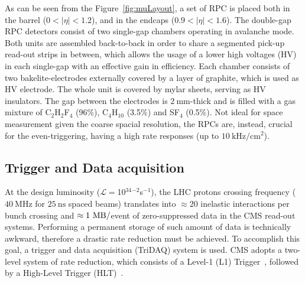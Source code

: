 As can be seen from the Figure~\ref{fig:muLayout}, a set of RPC is placed both in the barrel ($0<|\eta|<1.2$), 
and in the endcaps ($0.9<|\eta|<1.6$). The double-gap RPC detectors consist of two single-gap chambers operating in avalanche mode. 
Both units are assembled back-to-back in order to share a segmented pick-up read-out strips 
in between, which allows the usage of a lower high voltages (HV) in each single-gap with an effective gain in efficiency. 
Each chamber consists of two bakelite-electrodes externally covered by a layer of graphite, which is used
as HV electrode. The whole unit is covered by mylar sheets, serving as HV insulators.
The gap between the electrodes is $2~\si{\mm}$-thick and is filled with a gas mixture of C$_2$H$_2$F$_4$ (96\%), 
C$_4$H$_{10}$ (3.5\%) and SF$_4$ (0.5\%). Not ideal for space measurement given the coarse spacial resolution, 
the RPCs are, instead, crucial for the even-triggering, having a high rate responses (up to $10~\si{\kilo\hertz}/\si{\cm}^2$).


\subsection{Trigger and Data acquisition}
\label{subsec:triDAQ}

At the design luminosity ($\mathcal{L}=$10$^{34}$\cm$^{-2}$\si{s}$^{-1}$), the LHC protons crossing frequency 
($40~\si{\mega\hertz}$ for $25~\si{\ns}$ spaced beams) translates into $\approx 20$ inelastic interactions per bunch crossing and 
$\approx 1~\si{\mega\byte}/$event of zero-suppressed data in the CMS read-out systems. Performing a permanent storage of such 
amount of data is technically awkward, therefore a drastic rate reduction must be achieved. To accomplish this goal, a trigger and 
data acquisition (TriDAQ) system is used. CMS adopts a two-level system of rate reduction, which consists of a 
Level-1 (L1) Trigger~\cite{Bayatyan:706847}, followed by a High-Level Trigger (HLT)~\cite{Sphicas:2002gg}.

